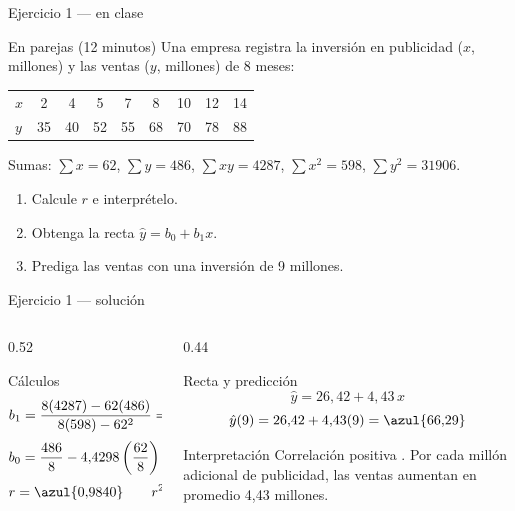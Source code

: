 \documentclass[aspectratio=169,10pt]{beamer}
\begin{document}
\begin{frame}{Ejercicio 1 — en clase}
  \begin{alertblock}{En parejas (12 minutos)}
    Una empresa registra la inversión en publicidad ($x$, millones) y las
    ventas ($y$, millones) de 8 meses:

    \vspace{0.2cm}
    \centering\footnotesize
    \begin{tabular}{@{}lcccccccc@{}}
      \toprule
      $x$ & 2 & 4 & 5 & 7 & 8 & 10 & 12 & 14 \\
      $y$ & 35 & 40 & 52 & 55 & 68 & 70 & 78 & 88 \\
      \bottomrule
    \end{tabular}

    \vspace{0.2cm}
    \raggedright
    Sumas: $\sum x=62$, $\sum y=486$, $\sum xy=4287$, $\sum x^{2}=598$,
    $\sum y^{2}=31906$.

    \vspace{0.15cm}
    \begin{enumerate}
      \item Calcule $r$ e interprételo.
      \item Obtenga la recta $\hat{y}=b_0+b_1x$.
      \item Prediga las ventas con una inversión de 9 millones.
    \end{enumerate}
  \end{alertblock}
\end{frame}

\begin{frame}{Ejercicio 1 — solución}
  \begin{columns}[T,onlytextwidth]
    \begin{column}{0.52\textwidth}
      \begin{block}{Cálculos}
        \footnotesize
        \[ b_1=\frac{8(4287)-62(486)}{8(598)-62^{2}}
              =\frac{34296-30132}{4784-3844}=\azul{4{,}4298} \]
        \[ b_0=\frac{486}{8}-4{,}4298\left(\frac{62}{8}\right)=\azul{26{,}4191} \]
        \[ r=\azul{0{,}9840} \qquad r^{2}=\azul{0{,}9682} \]
      \end{block}
    \end{column}
    \begin{column}{0.44\textwidth}
      \begin{exampleblock}{Recta y predicción}
        \footnotesize
        \[ \hat{y}=26{,}42+4{,}43\,x \]
        \[ \hat{y}(9)=26{,}42+4{,}43(9)=\azul{66{,}29} \]
      \end{exampleblock}
      \begin{alertblock}{Interpretación}
        \footnotesize
        Correlación positiva . Por cada millón adicional de
        publicidad, las ventas aumentan en promedio 4{,}43 millones.
      \end{alertblock}
    \end{column}
  \end{columns}
\end{frame}
\end{document}
